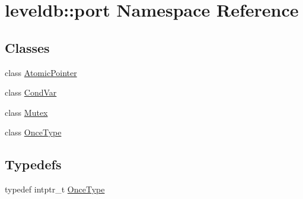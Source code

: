 \hypertarget{namespaceleveldb_1_1port}{}\section{leveldb\+:\+:port Namespace Reference}
\label{namespaceleveldb_1_1port}
\subsection*{Classes}
\begin{DoxyCompactItemize}
\item 
class \hyperlink{classleveldb_1_1port_1_1_atomic_pointer}{Atomic\+Pointer}
\item 
class \hyperlink{classleveldb_1_1port_1_1_cond_var}{Cond\+Var}
\item 
class \hyperlink{classleveldb_1_1port_1_1_mutex}{Mutex}
\item 
class \hyperlink{classleveldb_1_1port_1_1_once_type}{Once\+Type}
\end{DoxyCompactItemize}
\subsection*{Typedefs}
\begin{DoxyCompactItemize}
\item 
typedef intptr\+\_\+t \hyperlink{namespaceleveldb_1_1port_a80651a8fb458d9b7b3c1f492f9abd055}{Once\+Type}
\end{DoxyCompactItemize}

